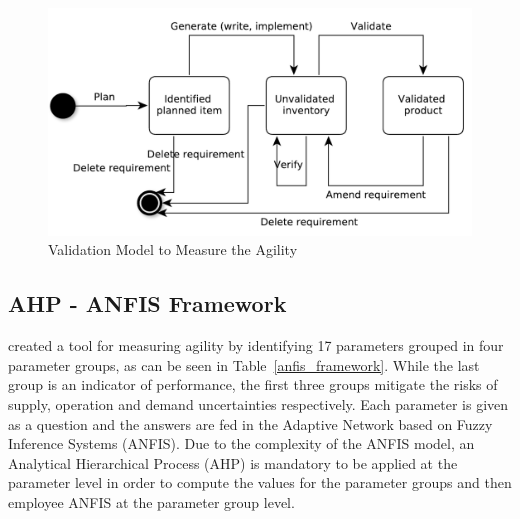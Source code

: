 \begin{figure} [H]
\centerline{\includegraphics[scale=0.6]{include/relatedwork/fig/validation_model.pdf}}
\caption{Validation Model to Measure the Agility} 
\label{validation_model}
\end{figure}

\subsection{AHP - ANFIS Framework} %
\citet{poonacha} created a tool for measuring agility by identifying 17 parameters grouped in four parameter groups, as can be seen in Table~\ref{anfis_framework}. While the last group is an indicator of performance, the first three groups mitigate the risks of supply, operation and demand uncertainties respectively. Each parameter is given as a question and the answers are fed in the Adaptive Network based on Fuzzy Inference Systems (ANFIS). Due to the complexity of the ANFIS model, an Analytical Hierarchical Process (AHP) is mandatory to be applied at the parameter level in order to compute the values for the parameter groups and then employee ANFIS at the parameter group level.

